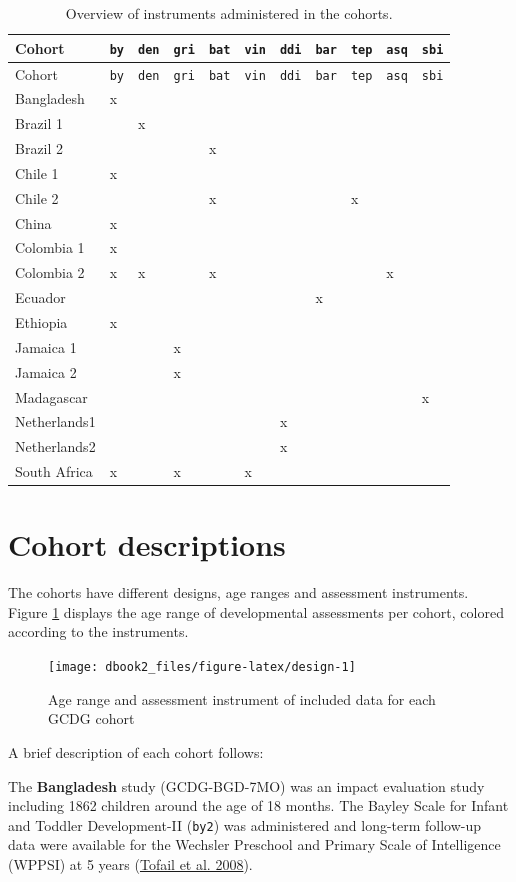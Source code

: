 \documentclass[
]{book}
\begin{document}
\begin{longtable}[]{@{}lllllllllll@{}}
\caption{\label{tab:cohorts} Overview of instruments administered in the cohorts.}\tabularnewline
\toprule
Cohort & \texttt{by} & \texttt{den} & \texttt{gri} & \texttt{bat} & \texttt{vin} & \texttt{ddi} & \texttt{bar} & \texttt{tep} & \texttt{asq} & \texttt{sbi}\tabularnewline
\midrule
\endfirsthead
\toprule
Cohort & \texttt{by} & \texttt{den} & \texttt{gri} & \texttt{bat} & \texttt{vin} & \texttt{ddi} & \texttt{bar} & \texttt{tep} & \texttt{asq} & \texttt{sbi}\tabularnewline
\midrule
\endhead
Bangladesh & x & & & & & & & & &\tabularnewline
Brazil 1 & & x & & & & & & & &\tabularnewline
Brazil 2 & & & & x & & & & & &\tabularnewline
Chile 1 & x & & & & & & & & &\tabularnewline
Chile 2 & & & & x & & & & x & &\tabularnewline
China & x & & & & & & & & &\tabularnewline
Colombia 1 & x & & & & & & & & &\tabularnewline
Colombia 2 & x & x & & x & & & & & x &\tabularnewline
Ecuador & & & & & & & x & & &\tabularnewline
Ethiopia & x & & & & & & & & &\tabularnewline
Jamaica 1 & & & x & & & & & & &\tabularnewline
Jamaica 2 & & & x & & & & & & &\tabularnewline
Madagascar & & & & & & & & & & x\tabularnewline
Netherlands1 & & & & & & x & & & &\tabularnewline
Netherlands2 & & & & & & x & & & &\tabularnewline
South Africa & x & & x & & x & & & & &\tabularnewline
\bottomrule
\end{longtable}

\hypertarget{sec:cohorts}{%
\section{Cohort descriptions}\label{sec:cohorts}}

The cohorts have different designs, age ranges and assessment instruments. Figure \ref{fig:design} displays the age range of developmental assessments per cohort, colored according to the instruments.

\begin{figure}

{\centering \texttt{[image: dbook2\_files/figure-latex/design-1]} 

}

\caption{Age range and assessment instrument of included data for each GCDG cohort}\label{fig:design}
\end{figure}



A brief description of each cohort follows:

The \textbf{Bangladesh} study (GCDG-BGD-7MO) was an impact evaluation study including 1862 children around the age of 18 months. The Bayley Scale for Infant and Toddler Development-II (\texttt{by2}) was administered and long-term follow-up data were available for the Wechsler Preschool and Primary Scale of Intelligence (WPPSI) at 5 years (\protect\hyperlink{ref-Tofail2008}{Tofail et al. 2008}).
\end{document}
